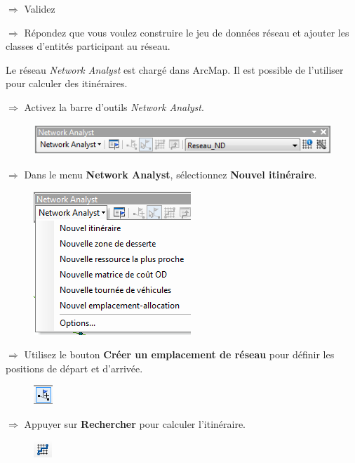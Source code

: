 \documentclass[11pt]{article}
\newcommand{\action}{$\Rightarrow$ }
\begin{document}
\action Validez

\action Répondez que vous voulez construire le jeu de données réseau et ajouter les classes d'entités participant au réseau.

Le réseau \textit{Network Analyst} est chargé dans ArcMap. Il est possible de l'utiliser pour calculer des itinéraires.

\action Activez la barre d'outils \textit{Network Analyst}.
\begin{figure}[H]
	\center \includegraphics{img/td3b/na_barre_outils.png} \\
\end{figure}

\action Dans le menu \textbf{Network Analyst}, sélectionnez \textbf{Nouvel itinéraire}.
\begin{figure}[H]
	\center \includegraphics{img/td3b/na_barre_outils-2.png} \\
\end{figure}

\action Utilisez le bouton \textbf{Créer un emplacement de réseau} pour définir les positions de départ et d'arrivée.
\begin{figure}[H]
	\center \includegraphics{img/td3b/na_creer_emplacement.png} \\
\end{figure}

\action Appuyer sur \textbf{Rechercher} pour calculer l'itinéraire.
\begin{figure}[H]
	\center \includegraphics{img/td3b/na_rechercher.png} \\
\end{figure}
\end{document}
